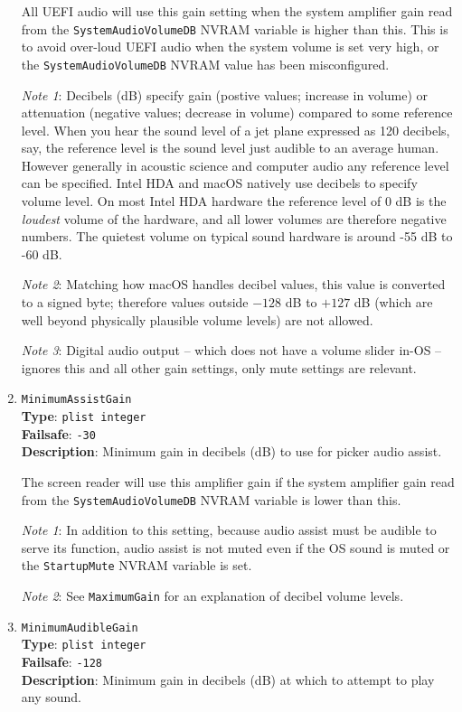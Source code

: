 \documentclass[]{article}
\begin{document}
\begin{enumerate}
  All UEFI audio will use this gain setting when the system amplifier gain read from the \texttt{SystemAudioVolumeDB}
  NVRAM variable is higher than this. This is to avoid over-loud UEFI audio when the system volume is set very high,
  or the \texttt{SystemAudioVolumeDB} NVRAM value has been misconfigured.

  \emph{Note 1}: Decibels (dB) specify gain (postive values; increase in volume) or attenuation (negative values; decrease
  in volume) compared to some reference level. When you hear the sound level of a jet plane expressed as 120 decibels, say,
  the reference level is the sound level just audible to an average human. However generally
  in acoustic science and computer audio any reference level can be specified. Intel HDA and macOS natively use
  decibels to specify volume level. On most Intel HDA hardware the reference level of 0 dB is the
  \emph{loudest} volume of the hardware, and all lower volumes are therefore negative numbers. The quietest volume
  on typical sound hardware is around -55 dB to -60 dB.

  \emph{Note 2}: Matching how macOS handles decibel values, this value is converted to a signed byte; therefore values
  outside $-128$ dB to $+127$ dB (which are well beyond physically plausible volume levels) are not allowed.

  \emph{Note 3}: Digital audio output -- which does not have a volume slider in-OS -- ignores this and all other gain settings,
  only mute settings are relevant.

  \item
  \texttt{MinimumAssistGain}\\
  \textbf{Type}: \texttt{plist\ integer}\\
  \textbf{Failsafe}: \texttt{-30}\\
  \textbf{Description}: Minimum gain in decibels (dB) to use for picker audio assist.

  The screen reader will use this amplifier gain if the system amplifier gain read from the \texttt{SystemAudioVolumeDB}
  NVRAM variable is lower than this.

  \emph{Note 1}: In addition to this setting, because audio assist must be audible to serve its function, audio assist
  is not muted even if the OS sound is muted or the \texttt{StartupMute} NVRAM variable is set.

  \emph{Note 2}: See \texttt{MaximumGain} for an explanation of decibel volume levels.

  \item
  \texttt{MinimumAudibleGain}\\
  \textbf{Type}: \texttt{plist\ integer}\\
  \textbf{Failsafe}: \texttt{-128}\\
  \textbf{Description}: Minimum gain in decibels (dB) at which to attempt to play any sound.


\end{enumerate}
\end{document}
